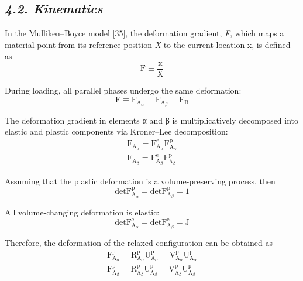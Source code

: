 \documentclass{article}
\begin{document}
\subsection*{\emph{4.2. Kinematics}}

In the Mulliken–Boyce model [35], the deformation gradient, \emph{F}, which maps a material point from its reference position \emph{X} to the current location x, is defined as
\begin{equation*}
\mathrm{F} \equiv \frac{\mathrm{x}}{\mathrm{X}} \tag{1}
\end{equation*}

During loading, all parallel phases undergo the same deformation:
\begin{equation*}
\mathrm{F} \equiv \mathrm{F}_{\mathrm{A}_\alpha} = \mathrm{F}_{\mathrm{A}_\beta} = \mathrm{F}_{\mathrm{B}} \tag{2}
\end{equation*}

The deformation gradient in elements α and β is multiplicatively decomposed into elastic and plastic components via Kroner–Lee decomposition:
\begin{gather*}
\mathrm{F}_{\mathrm{A}_\alpha} = \mathrm{F}^{\mathrm{e}}_{\mathrm{A}_\alpha}\mathrm{F}^{\mathrm{p}}_{\mathrm{A}_\alpha} \tag{3}\\
\mathrm{F}_{\mathrm{A}_\beta} = \mathrm{F}^{\mathrm{e}}_{\mathrm{A}_\beta}\mathrm{F}^{\mathrm{p}}_{\mathrm{A}_\beta} \tag{4}
\end{gather*}

Assuming that the plastic deformation is a volume-preserving process, then
\begin{equation*}
\mathrm{detF}^{\mathrm{p}}_{\mathrm{A}_\alpha} = \mathrm{detF}^{\mathrm{p}}_{\mathrm{A}_\beta} = 1 \tag{5}
\end{equation*}

All volume-changing deformation is elastic:
\begin{equation*}
\mathrm{detF}^{\mathrm{e}}_{\mathrm{A}_\alpha} = \mathrm{detF}^{\mathrm{e}}_{\mathrm{A}_\beta} = \mathrm{J} \tag{6}
\end{equation*}

Therefore, the deformation of the relaxed configuration can be obtained as
\begin{gather*}
\mathrm{F}^{\mathrm{p}}_{\mathrm{A}_\alpha} = \mathrm{R}^{\mathrm{p}}_{\mathrm{A}_\alpha}\mathrm{U}^{\mathrm{p}}_{\mathrm{A}_\alpha} = \mathrm{V}^{\mathrm{p}}_{\mathrm{A}_\alpha}\mathrm{U}^{\mathrm{p}}_{\mathrm{A}_\alpha} \tag{7}\\
\mathrm{F}^{\mathrm{p}}_{\mathrm{A}_\beta} = \mathrm{R}^{\mathrm{p}}_{\mathrm{A}_\beta}\mathrm{U}^{\mathrm{p}}_{\mathrm{A}_\beta} = \mathrm{V}^{\mathrm{p}}_{\mathrm{A}_\beta}\mathrm{U}^{\mathrm{p}}_{\mathrm{A}_\beta} \tag{8}
\end{gather*}
\end{document}
